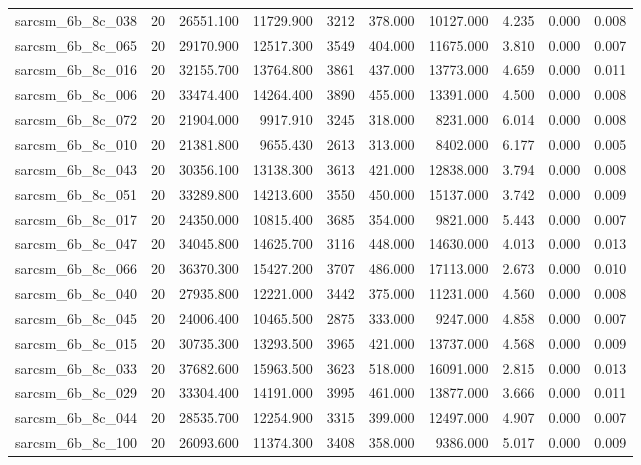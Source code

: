 \begin{tabular}{lrrrrrrrrr}
sarcsm\_6b\_8c\_038 & 20 & 26551.100 & 11729.900 & 3212 & 378.000 & 10127.000 & 4.235 & 0.000 & 0.008 \\
sarcsm\_6b\_8c\_065 & 20 & 29170.900 & 12517.300 & 3549 & 404.000 & 11675.000 & 3.810 & 0.000 & 0.007 \\
sarcsm\_6b\_8c\_016 & 20 & 32155.700 & 13764.800 & 3861 & 437.000 & 13773.000 & 4.659 & 0.000 & 0.011 \\
sarcsm\_6b\_8c\_006 & 20 & 33474.400 & 14264.400 & 3890 & 455.000 & 13391.000 & 4.500 & 0.000 & 0.008 \\
sarcsm\_6b\_8c\_072 & 20 & 21904.000 & 9917.910 & 3245 & 318.000 & 8231.000 & 6.014 & 0.000 & 0.008 \\
sarcsm\_6b\_8c\_010 & 20 & 21381.800 & 9655.430 & 2613 & 313.000 & 8402.000 & 6.177 & 0.000 & 0.005 \\
sarcsm\_6b\_8c\_043 & 20 & 30356.100 & 13138.300 & 3613 & 421.000 & 12838.000 & 3.794 & 0.000 & 0.008 \\
sarcsm\_6b\_8c\_051 & 20 & 33289.800 & 14213.600 & 3550 & 450.000 & 15137.000 & 3.742 & 0.000 & 0.009 \\
sarcsm\_6b\_8c\_017 & 20 & 24350.000 & 10815.400 & 3685 & 354.000 & 9821.000 & 5.443 & 0.000 & 0.007 \\
sarcsm\_6b\_8c\_047 & 20 & 34045.800 & 14625.700 & 3116 & 448.000 & 14630.000 & 4.013 & 0.000 & 0.013 \\
sarcsm\_6b\_8c\_066 & 20 & 36370.300 & 15427.200 & 3707 & 486.000 & 17113.000 & 2.673 & 0.000 & 0.010 \\
sarcsm\_6b\_8c\_040 & 20 & 27935.800 & 12221.000 & 3442 & 375.000 & 11231.000 & 4.560 & 0.000 & 0.008 \\
sarcsm\_6b\_8c\_045 & 20 & 24006.400 & 10465.500 & 2875 & 333.000 & 9247.000 & 4.858 & 0.000 & 0.007 \\
sarcsm\_6b\_8c\_015 & 20 & 30735.300 & 13293.500 & 3965 & 421.000 & 13737.000 & 4.568 & 0.000 & 0.009 \\
sarcsm\_6b\_8c\_033 & 20 & 37682.600 & 15963.500 & 3623 & 518.000 & 16091.000 & 2.815 & 0.000 & 0.013 \\
sarcsm\_6b\_8c\_029 & 20 & 33304.400 & 14191.000 & 3995 & 461.000 & 13877.000 & 3.666 & 0.000 & 0.011 \\
sarcsm\_6b\_8c\_044 & 20 & 28535.700 & 12254.900 & 3315 & 399.000 & 12497.000 & 4.907 & 0.000 & 0.007 \\
sarcsm\_6b\_8c\_100 & 20 & 26093.600 & 11374.300 & 3408 & 358.000 & 9386.000 & 5.017 & 0.000 & 0.009 \\

\end{tabular}
